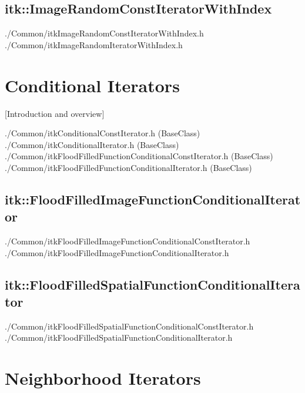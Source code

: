 \subsection{itk::ImageRandomConstIteratorWithIndex}
\label{sec:itkImageRandomConstIteratorWithIndex}
./Common/itkImageRandomConstIteratorWithIndex.h
./Common/itkImageRandomIteratorWithIndex.h


\section{Conditional Iterators}
\label{sec:ConditionalIterators}

[Introduction and overview]

./Common/itkConditionalConstIterator.h (BaseClass)
./Common/itkConditionalIterator.h (BaseClass)
./Common/itkFloodFilledFunctionConditionalConstIterator.h (BaseClass)
./Common/itkFloodFilledFunctionConditionalIterator.h (BaseClass)


%

\subsection{itk::FloodFilledImageFunctionConditionalIterator}
\label{itk::FloodFilledImageFunctionConditionalIterator}
./Common/itkFloodFilledImageFunctionConditionalConstIterator.h
./Common/itkFloodFilledImageFunctionConditionalIterator.h


\subsection{itk::FloodFilledSpatialFunctionConditionalIterator}
\label{itk::FloodFilledSpatialFunctionConditionalIterator}
./Common/itkFloodFilledSpatialFunctionConditionalConstIterator.h
./Common/itkFloodFilledSpatialFunctionConditionalIterator.h


\section{Neighborhood Iterators}
\label{sec:NeighborhoodIterators}

